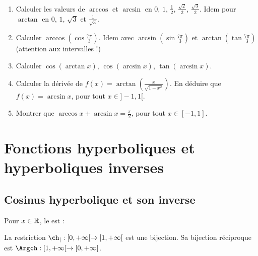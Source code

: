 \documentclass[class=report,crop=false]{standalone}
\begin{document}

\begin{miniexercices}
\sauteligne
\begin{enumerate}
  \item Calculer les valeurs de $\arccos$ et $\arcsin$ en
  $0$, $1$, $\frac12$, $\frac{\sqrt2}{2}$, $\frac{\sqrt3}{2}$. Idem pour
  $\arctan$ en $0$, $1$, $\sqrt3$ et $\frac{1}{\sqrt3}$.

  \item Calculer $\arccos(\cos \frac{7\pi}{3})$. Idem avec $\arcsin(\sin \frac{7\pi}{3})$
  et $\arctan(\tan \frac{7\pi}{3})$ (attention aux intervalles !)

  \item Calculer $\cos(\arctan x)$, $\cos(\arcsin x)$, $\tan(\arcsin x)$.

  \item Calculer la dérivée de $f(x)=\arctan\left(\frac{x}{\sqrt{1-x^2}}\right)$.
  En déduire que $f(x)= \arcsin x$, pour tout $x\in]-1,1[$.

  \item Montrer que $\arccos x + \arcsin x = \frac\pi2$, pour tout $x \in[-1,1]$.
\end{enumerate}
\end{miniexercices}

\section{Fonctions hyperboliques et hyperboliques inverses}



\subsection{Cosinus hyperbolique et son inverse}

Pour $x\in \mathbb{R}$, le  est :

La restriction $\ch_| : [0,+\infty[ \to [1,+\infty[$ est une bijection.
Sa bijection réciproque est $\Argch : [1,+\infty[ \to [0,+\infty[$.
\end{document}
